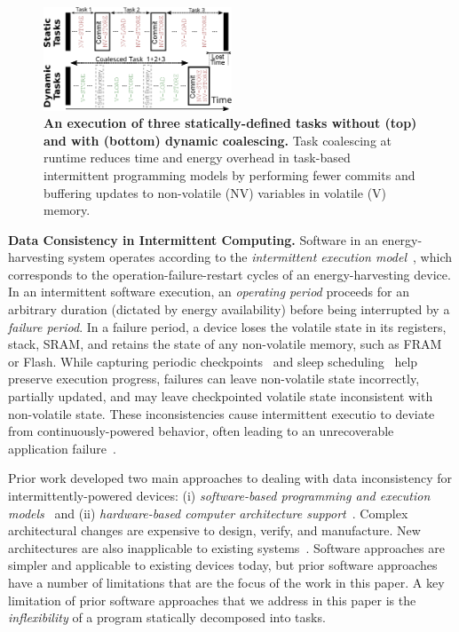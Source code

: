 \begin{figure}
    \centering
    \includegraphics[width=0.5\textwidth]{figures/coalescing-is}
    \caption{\textbf{An execution of three
statically-defined tasks without (top) and with (bottom) dynamic
coalescing.} Task coalescing at runtime reduces time and energy overhead in
task-based intermittent programming models by performing fewer commits and
buffering updates to non-volatile (NV) variables in volatile (V) memory.}
    \label{fig:coalesce}
\end{figure}

\textbf{Data Consistency in Intermittent Computing.}  Software in an
energy-harvesting system operates according to the {\em intermittent execution
model}~\citep{dino,lucia_snapl_2017}, which corresponds to the
operation-failure-restart cycles of an energy-harvesting device. In an
intermittent software execution, an {\em operating period} proceeds for an
arbitrary duration (dictated by energy availability) before being interrupted
by a {\em failure period}. In a failure period, a device loses the volatile
state in its registers, stack, SRAM, and retains the state of any non-volatile
memory, such as FRAM or Flash. While capturing periodic
checkpoints~\citep{mementos,quickrecall} and sleep
scheduling~\citep{dewdrop,hibernus,hibernusplusplus} help preserve execution
progress, failures can leave non-volatile state incorrectly, partially updated,
and may leave checkpointed volatile state inconsistent with non-volatile state.
These inconsistencies cause intermittent executio to deviate from
continuously-powered behavior, often leading to an unrecoverable
application failure~\citep{dino,edb}. 

Prior work developed two main approaches to dealing with data inconsistency for
intermittently-powered devices: (i) \emph{software-based programming and
execution models}~\citep{dino,ratchet,chain,alpaca} and (ii)
\emph{hardware-based computer architecture
support}~\citep{hicks_isca_2017,idetic,nvp}.  Complex architectural changes are
expensive to design, verify, and manufacture.  New architectures are also
inapplicable to existing systems~\citep{hicks_isca_2017,nvp}. Software
approaches are simpler and applicable to existing devices today, but prior
software approaches have a number of limitations that are the focus of the work
in this paper.  A key limitation of prior software approaches that we address in this paper is the {\em inflexibility}
of a program statically decomposed into tasks. 

